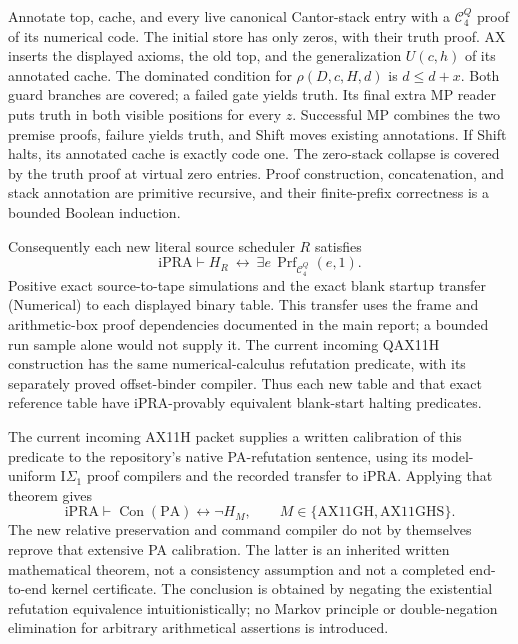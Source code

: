 Annotate top, cache, and every live canonical Cantor-stack entry with a
$\mathcal C_4^Q$ proof of its numerical code.  The initial store has only
zeros, with their truth proof.  AX inserts the displayed axioms, the old
top, and the generalization $U(c,h)$ of its annotated cache.
The dominated condition for $\rho(D,c,H,d)$ is $d\le d+x$.
Both guard branches are covered; a failed gate yields truth.  Its final
extra MP reader puts truth in both visible positions for every $z$.
Successful MP combines the two premise proofs, failure yields truth,
and Shift moves existing annotations.  If Shift halts, its annotated
cache is exactly code one.  The zero-stack collapse is covered by the
truth proof at virtual zero entries.  Proof construction, concatenation,
and stack annotation are primitive recursive, and their finite-prefix
correctness is a bounded Boolean induction.

Consequently each new literal source scheduler $R$ satisfies
\[
 \mathrm{iPRA}\vdash
 H_{R}
 \ \longleftrightarrow\
 \exists e\,\operatorname{Prf}_{\mathcal C_4^Q}(e,1).     \tag{Numerical}
\]
Positive exact source-to-tape simulations and the exact blank startup
transfer (Numerical) to each displayed binary table.  This transfer uses
the frame and arithmetic-box proof dependencies documented in the main
report; a bounded run sample alone would not supply it.
The current incoming QAX11H construction has the same numerical-calculus
refutation predicate, with its separately proved offset-binder compiler.
Thus each new table and that exact reference table have iPRA-provably
equivalent blank-start halting predicates.

The current incoming AX11H packet supplies a written calibration of this
predicate to the repository's native PA-refutation sentence, using its
model-uniform $\mathrm I\Sigma_1$ proof compilers and the recorded transfer
to iPRA.  Applying that theorem gives
\[
 \boxed{\mathrm{iPRA}\vdash
       \operatorname{Con}(\mathrm{PA})
       \longleftrightarrow\neg H_M,
       \qquad M\in\{\mathrm{AX11GH},\mathrm{AX11GHS}\}.}
\]
The new relative preservation and command compiler do not by themselves
reprove that extensive PA calibration.  The latter is an inherited written
mathematical theorem, not a consistency assumption and not a completed
end-to-end kernel certificate.  The conclusion is obtained by negating the
existential refutation equivalence intuitionistically; no Markov principle
or double-negation elimination for arbitrary arithmetical assertions is
introduced.
